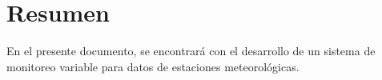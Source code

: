 \chapter*{Resumen}


En el presente documento, se encontrará con el desarrollo de un sistema de monitoreo variable para datos de estaciones meteorológicas.
